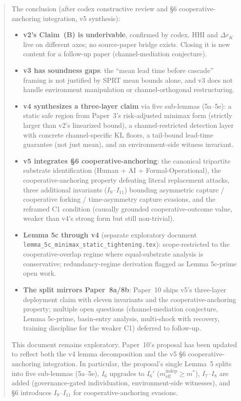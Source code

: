 \documentclass{article}
\newcommand{\meff}{m_{\mathrm{eff}}}
\begin{document}
\begin{abstract}
The conclusion (after codex constructive review and \S6
cooperative-anchoring integration, v5 synthesis):
\begin{itemize}
\item \textbf{v2's Claim~(B) is underivable}, confirmed by codex.  HHI
  and $\Delta r_K$ live on different axes; no source-paper bridge
  exists.  Closing it is new content for a follow-up paper
  (channel-mediation conjecture).
\item \textbf{v3 has soundness gaps}: the ``mean lead time before
  cascade'' framing is not justified by SPRT mean bounds alone, and
  v3 does not handle environment manipulation or
  channel-orthogonal restructuring.
\item \textbf{v4 synthesizes a three-layer claim} via five sub-lemmas
  (5a--5e): a static safe region from Paper~3's risk-adjusted minimax
  form (strictly larger than v2's linearized bound), a
  channel-restricted detection layer with concrete channel-specific
  KL floors, a tail-bound lead-time guarantee (not just mean), and
  an environment-side witness invariant.
\item \textbf{v5 integrates \S6 cooperative-anchoring}: the canonical
  tripartite substrate identification (Human + AI +
  Formal-Operational), the cooperative-anchoring property defeating
  literal replacement attacks, three additional invariants
  ($I_9$--$I_{11}$) bounding asymmetric capture / cooperative
  forking / time-asymmetry capture evasions, and the reframed C1
  condition (causally grounded cooperative-outcome value, weaker
  than v4's strong form but still non-trivial).
\item \textbf{Lemma 5c through v4} (separate exploratory document
  \texttt{lemma\_5c\_minimax\_static\_tightening.tex}):
  scope-restricted to the cooperative-overlap regime where
  equal-substrate analysis is conservative; redundancy-regime
  derivation flagged as Lemma 5c-prime open work.
\item \textbf{The split mirrors Paper~8a/8b}: Paper~10 ships v5's
  three-layer deployment claim with eleven invariants and the
  cooperative-anchoring property; multiple open questions
  (channel-mediation conjecture, Lemma 5c-prime, basin-entry
  analysis, multi-shock with recovery, training discipline for the
  weaker C1) deferred to follow-up.
\end{itemize}

This document remains exploratory.  Paper~10's proposal has been
updated to reflect both the v4 lemma decomposition and the v5
\S6 cooperative-anchoring integration.  In particular, the
proposal's single Lemma~5 splits into five sub-lemmas (5a--5e),
$I_6$ upgrades to $I_6'$ ($\meff^{\mathrm{indep}} \geq m^*$),
$I_7$--$I_8$ are added (governance-gated individuation,
environment-side witnesses), and \S6 introduces $I_9$--$I_{11}$
for cooperative-anchoring evasions.
\end{abstract}
\end{document}
